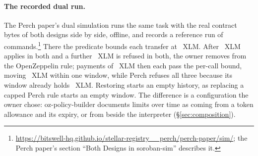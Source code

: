 
\paragraph{The recorded dual run.} The Perch paper's dual simulation runs the
same task with the real contract bytes of both designs side by side, offline, and
records a reference run of 
commands.\footnote{\url{https://bitswell-hq.github.io/stellar-registry__perch/perch-paper/sim/};
the Perch paper's section ``Both Designs in soroban-sim'' describes it.} There
the predicate bounds each transfer at ~XLM. After
~XLM applies in both and a further ~XLM is
refused in both, the owner removes  from the OpenZeppelin
rule;  payments of ~XLM then each
pass the per-call bound, moving ~XLM within one
window, while Perch refuses all three because its window already holds
~XLM. Restoring 
starts an empty history, as replacing a capped Perch rule starts an empty window.
The difference is a configuration the owner chose: oz-policy-builder documents
limits over time as coming from a token allowance and its expiry, or from
 beside the interpreter (\S\ref{sec:composition}).
